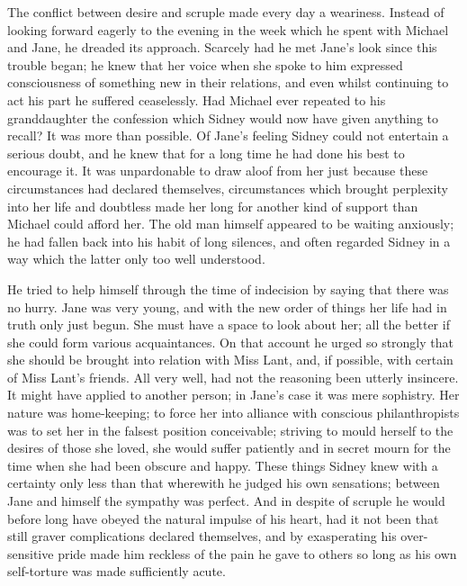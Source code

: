The conflict between desire and scruple made every day a weariness.
Instead of looking forward eagerly to the evening in the week which he
spent with Michael and Jane, he dreaded its approach. Scarcely had he
met Jane's look since this trouble began; he knew that her voice when
she spoke to him expressed consciousness of something new in their
relations, and even whilst continuing to act his part he suffered
ceaselessly. Had Michael ever repeated to his granddaughter the
confession which Sidney would now have given anything to recall? It was
more than possible. Of Jane's feeling Sidney could not entertain a
serious doubt, and he knew that for a long time he had done his best to
encourage it. It was unpardonable to draw aloof
{\protect\hypertarget{276}{}{}}from her just because these circumstances
had declared themselves, circumstances which brought perplexity into her
life and doubtless made her long for another kind of support than
Michael could afford her. The old man himself appeared to be waiting
anxiously; he had fallen back into his habit of long silences, and often
regarded Sidney in a way which the latter only too well understood.

He tried to help himself through the time of indecision by saying that
there was no hurry. Jane was very young, and with the new order of
things her life had in truth only just begun. She must have a space to
look about her; all the better if she could form various acquaintances.
On that account he urged so strongly that she should be brought into
relation with Miss Lant, and, if possible, with certain of Miss Lant's
friends. All very well, had not the reasoning been utterly insincere. It
might have applied to another person; in Jane's case it was mere
sophistry. Her nature was home-keeping; to force her into alliance with
conscious {\protect\hypertarget{277}{}{}}philanthropists was to set her
in the falsest position conceivable; striving to mould herself to the
desires of those she loved, she would suffer patiently and in secret
mourn for the time when she had been obscure and happy. These things
Sidney knew with a certainty only less than that wherewith he judged his
own sensations; between Jane and himself the sympathy was perfect. And
in despite of scruple he would before long have obeyed the natural
impulse of his heart, had it not been that still graver complications
declared themselves, and by exasperating his over-sensitive pride made
him reckless of the pain he gave to others so long as his own
self-torture was made sufficiently acute.

